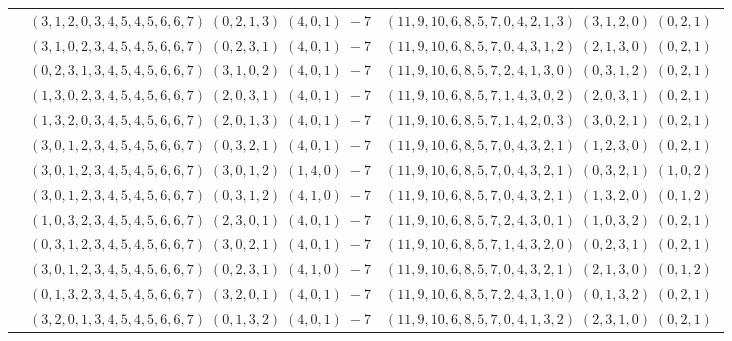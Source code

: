 \documentclass[11pt]{article}
\begin{document}
\begin{longtable}[l]{|c|c|c|}
 \cline{2-3} 
 & $(3 ,1 ,2 ,0 ,3 ,4 ,5 ,4 ,5 ,6 ,6 ,7) \;(0 ,2 ,1 ,3) \;(4 ,0 ,1) \;-7$ & $(11 ,9 ,10 ,6 ,8 ,5 ,7 ,0 ,4 ,2 ,1 ,3) \;(3 ,1 ,2 ,0) \;(0 ,2 ,1) \;$\\ 
 \cline{2-3} 
 & $(3 ,1 ,0 ,2 ,3 ,4 ,5 ,4 ,5 ,6 ,6 ,7) \;(0 ,2 ,3 ,1) \;(4 ,0 ,1) \;-7$ & $(11 ,9 ,10 ,6 ,8 ,5 ,7 ,0 ,4 ,3 ,1 ,2) \;(2 ,1 ,3 ,0) \;(0 ,2 ,1) \;$\\ 
 \cline{2-3} 
 & $(0 ,2 ,3 ,1 ,3 ,4 ,5 ,4 ,5 ,6 ,6 ,7) \;(3 ,1 ,0 ,2) \;(4 ,0 ,1) \;-7$ & $(11 ,9 ,10 ,6 ,8 ,5 ,7 ,2 ,4 ,1 ,3 ,0) \;(0 ,3 ,1 ,2) \;(0 ,2 ,1) \;$\\ 
 \cline{2-3} 
 & $(1 ,3 ,0 ,2 ,3 ,4 ,5 ,4 ,5 ,6 ,6 ,7) \;(2 ,0 ,3 ,1) \;(4 ,0 ,1) \;-7$ & $(11 ,9 ,10 ,6 ,8 ,5 ,7 ,1 ,4 ,3 ,0 ,2) \;(2 ,0 ,3 ,1) \;(0 ,2 ,1) \;$\\ 
 \cline{2-3} 
 & $(1 ,3 ,2 ,0 ,3 ,4 ,5 ,4 ,5 ,6 ,6 ,7) \;(2 ,0 ,1 ,3) \;(4 ,0 ,1) \;-7$ & $(11 ,9 ,10 ,6 ,8 ,5 ,7 ,1 ,4 ,2 ,0 ,3) \;(3 ,0 ,2 ,1) \;(0 ,2 ,1) \;$\\ 
 \cline{2-3} 
 & $(3 ,0 ,1 ,2 ,3 ,4 ,5 ,4 ,5 ,6 ,6 ,7) \;(0 ,3 ,2 ,1) \;(4 ,0 ,1) \;-7$ & $(11 ,9 ,10 ,6 ,8 ,5 ,7 ,0 ,4 ,3 ,2 ,1) \;(1 ,2 ,3 ,0) \;(0 ,2 ,1) \;$\\ 
 \cline{2-3} 
 & $(3 ,0 ,1 ,2 ,3 ,4 ,5 ,4 ,5 ,6 ,6 ,7) \;(3 ,0 ,1 ,2) \;(1 ,4 ,0) \;-7$ & $(11 ,9 ,10 ,6 ,8 ,5 ,7 ,0 ,4 ,3 ,2 ,1) \;(0 ,3 ,2 ,1) \;(1 ,0 ,2) \;$\\ 
 \cline{2-3} 
 & $(3 ,0 ,1 ,2 ,3 ,4 ,5 ,4 ,5 ,6 ,6 ,7) \;(0 ,3 ,1 ,2) \;(4 ,1 ,0) \;-7$ & $(11 ,9 ,10 ,6 ,8 ,5 ,7 ,0 ,4 ,3 ,2 ,1) \;(1 ,3 ,2 ,0) \;(0 ,1 ,2) \;$\\ 
 \cline{2-3} 
 & $(1 ,0 ,3 ,2 ,3 ,4 ,5 ,4 ,5 ,6 ,6 ,7) \;(2 ,3 ,0 ,1) \;(4 ,0 ,1) \;-7$ & $(11 ,9 ,10 ,6 ,8 ,5 ,7 ,2 ,4 ,3 ,0 ,1) \;(1 ,0 ,3 ,2) \;(0 ,2 ,1) \;$\\ 
 \cline{2-3} 
 & $(0 ,3 ,1 ,2 ,3 ,4 ,5 ,4 ,5 ,6 ,6 ,7) \;(3 ,0 ,2 ,1) \;(4 ,0 ,1) \;-7$ & $(11 ,9 ,10 ,6 ,8 ,5 ,7 ,1 ,4 ,3 ,2 ,0) \;(0 ,2 ,3 ,1) \;(0 ,2 ,1) \;$\\ 
 \cline{2-3} 
 & $(3 ,0 ,1 ,2 ,3 ,4 ,5 ,4 ,5 ,6 ,6 ,7) \;(0 ,2 ,3 ,1) \;(4 ,1 ,0) \;-7$ & $(11 ,9 ,10 ,6 ,8 ,5 ,7 ,0 ,4 ,3 ,2 ,1) \;(2 ,1 ,3 ,0) \;(0 ,1 ,2) \;$\\ 
 \cline{2-3} 
 & $(0 ,1 ,3 ,2 ,3 ,4 ,5 ,4 ,5 ,6 ,6 ,7) \;(3 ,2 ,0 ,1) \;(4 ,0 ,1) \;-7$ & $(11 ,9 ,10 ,6 ,8 ,5 ,7 ,2 ,4 ,3 ,1 ,0) \;(0 ,1 ,3 ,2) \;(0 ,2 ,1) \;$\\ 
 \cline{2-3} 
 & $(3 ,2 ,0 ,1 ,3 ,4 ,5 ,4 ,5 ,6 ,6 ,7) \;(0 ,1 ,3 ,2) \;(4 ,0 ,1) \;-7$ & $(11 ,9 ,10 ,6 ,8 ,5 ,7 ,0 ,4 ,1 ,3 ,2) \;(2 ,3 ,1 ,0) \;(0 ,2 ,1) \;$\\ 

\end{longtable}
\end{document}
